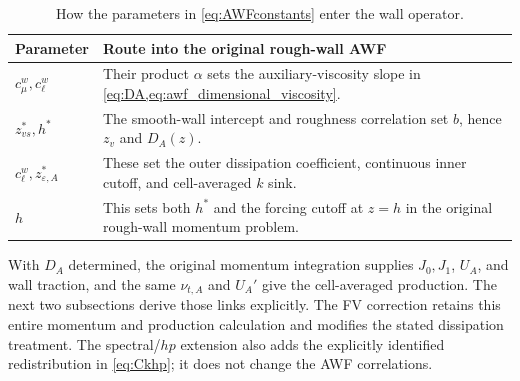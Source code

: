 \documentclass[11pt,a4paper]{article}
\numberwithin{equation}{section}
\newcommand{\eps}{\varepsilon}
\begin{document}
\begin{table}[htbp]
\centering\small
\begin{tabularx}{\linewidth}{@{}lX@{}}
\toprule
Parameter & Route into the original rough-wall AWF\\
\midrule
$c_\mu^w,c_\ell^w$ & Their product $\alpha$ sets the auxiliary-viscosity
slope in \cref{eq:DA,eq:awf_dimensional_viscosity}.\\
$z_{vs}^*,h^*$ & The smooth-wall intercept and roughness correlation set
$b$, hence $z_v$ and $D_A(z)$.\\
$c_\ell^w,z_{\eps,A}^*$ & These set the outer dissipation coefficient,
continuous inner cutoff, and cell-averaged $k$ sink.\\
$h$ & This sets both $h^*$ and the forcing cutoff at $z=h$ in the original
rough-wall momentum problem.\\
\bottomrule
\end{tabularx}
\caption{How the parameters in \cref{eq:AWFconstants} enter the wall operator.}
\label{tab:awf-parameter-roles}
\end{table}
With $D_A$ determined, the original momentum integration supplies
$J_0,J_1$, $U_A$, and wall traction, and the same $\nu_{t,A}$ and $U_A'$
give the cell-averaged production. The next two subsections derive those
links explicitly. The FV correction retains this entire momentum and production
calculation and modifies the stated dissipation treatment. The
spectral/$hp$ extension also adds the explicitly identified redistribution
in \cref{eq:Ckhp}; it does not change the AWF correlations.
\end{document}
